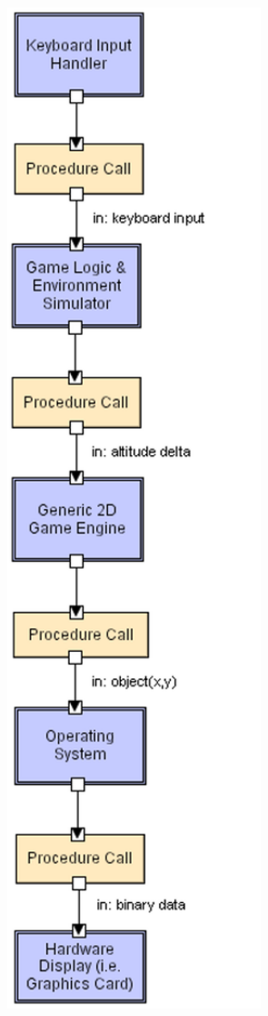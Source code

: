 \documentclass[xetex,mathserif,serif]{beamer}
\begin{document}
\begin{frame}
\begin{columns}
\begin{column}{0.19\textwidth}
\begin{center}
                    \includegraphics[width=0.8\textwidth]{layeredLL.png}
                \end{center}
            \end{column}
        \end{columns}
    \end{frame}
\end{document}
